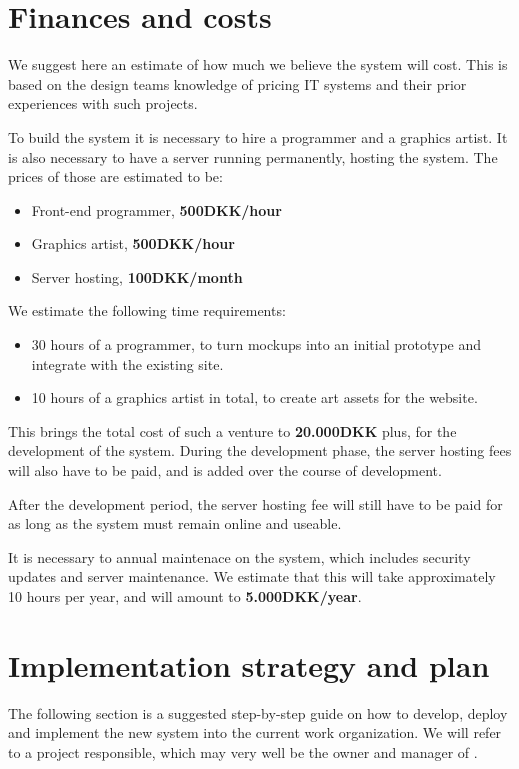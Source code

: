\newpage
\section{Finances and costs}
We suggest here an estimate of how much we believe the system will cost. This
is based on the design teams knowledge of pricing IT systems and their 
prior experiences with such projects. 

To build the system it is necessary to hire a programmer and a graphics artist.
It is also necessary to have a server running permanently, hosting the system. 
The prices of those are estimated to be:

\begin{itemize}
\item Front-end programmer, \textbf{500DKK/hour}
\item Graphics artist, \textbf{500DKK/hour}
\item Server hosting, \textbf{100DKK/month}
\end{itemize}

We estimate the following time requirements:

\begin{itemize}
	\item 30 hours of a programmer, to turn mockups into an initial prototype and integrate with the existing site.
	\item 10 hours of a graphics artist in total, to create art assets for the website.
\end{itemize}

This brings the total cost of such a venture to \textbf{20.000DKK} plus, for the 
development of the system. During the development phase, the server hosting
fees will also have to be paid, and is added over the course of development.

After the development period, the server hosting fee will still have to be paid
for as long as the system must remain online and useable. 

It is necessary to annual maintenace on the system, which includes security updates
and server maintenance. We estimate that this will take approximately 10 hours per year, 
and will amount to \textbf{5.000DKK/year}.

\newpage
\section{Implementation strategy and plan}
The following section is a suggested step-by-step guide on how to develop, 
deploy and implement the new system into the current work organization. We 
will refer to a project responsible, which may very well be the owner and 
manager of \gomonkey{}.

